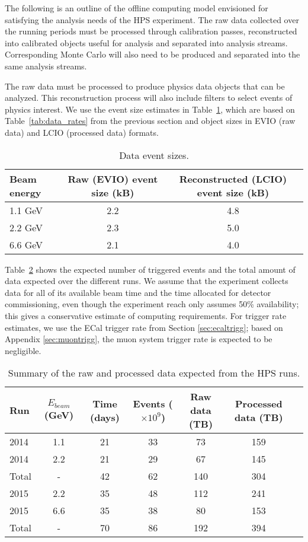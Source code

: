 
The following is an outline of the offline computing model envisioned for satisfying the analysis needs of the HPS experiment. The raw data collected over the running periods must be processed through calibration passes, reconstructed into calibrated objects useful for analysis and separated into analysis streams. Corresponding Monte Carlo will also need to be produced and separated into the same analysis streams.

The raw data must be processed to produce physics data objects that can be analyzed. 
This reconstruction process will also include filters to select events of physics interest. We use the event size estimates 
in Table~\ref{tab:raw_data_size}, which are based on Table~\ref{tab:data_rates} from the previous section and object sizes 
in EVIO (raw data) and LCIO (processed data) formats. 
\begin{table}[ht]
\centering
\begin{tabular}{|l|c|c|}
\hline
Beam energy & Raw (EVIO) event size (kB) & Reconstructed (LCIO) event size (kB) \\ 
\hline
1.1 GeV  &  2.2 & 4.8 \\
2.2 GeV  &  2.3 & 5.0 \\
6.6 GeV  &  2.1 & 4.0 \\
\hline
\end{tabular}
\caption{{\small Data event sizes. }}
\label{tab:raw_data_size}
\end{table}

Table~\ref{tab:data_volume} shows the expected number of triggered events and
the total amount of data expected over the 
different runs. 
We assume that the experiment collects data for all of its available beam time and the time allocated for detector commissioning, even though the experiment reach only assumes 50\% availability; this gives a conservative estimate of computing requirements. 
For trigger rate estimates, we use the ECal trigger rate from Section \ref{sec:ecaltrigg}; based on Appendix \ref{sec:muontrigg}, the muon system trigger rate is expected to be negligible.
\begin{table}[ht]
\centering
\begin{tabular}{|l|c|c|c|c|c|c|}
\hline
Run & $E_{beam}$ (GeV) & Time (days) & Events ($\times 10^9$) & Raw data (TB) & Processed data (TB)\\
\hline
2014 & 1.1 & 21 & 33 & 73 & 159 \\
2014 & 2.2 & 21 & 29 & 67 & 145  \\
\hline
Total & - & 42 & 62 & 140 & 304 \\
\hline
2015 & 2.2 & 35 & 48 & 112 & 241 \\
2015 & 6.6 & 35 & 38 & 80 & 153 \\
\hline
Total & - & 70 & 86 & 192 & 394 \\
\hline
\end{tabular}
\caption{{\small Summary of the raw and processed data expected from the HPS runs. }}
\label{tab:data_volume}
\end{table}


